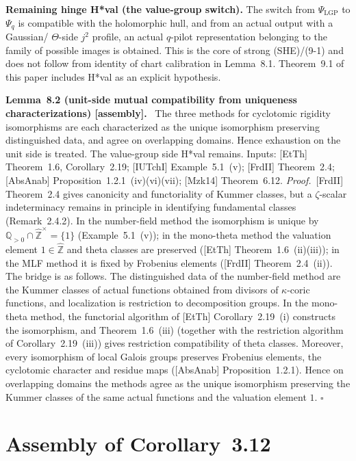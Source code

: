 \documentclass[11pt]{article}
\newcommand{\stmt}[2]{\medskip\noindent\textbf{#1\ #2.}\ }
\newcommand{\pf}{\medskip\noindent\textit{Proof.}\ }
\newcommand{\qedh}{\hfill\(\square\)\par\medskip}
\begin{document}
\medskip
\noindent\textbf{Remaining hinge H*val (the value-group switch).}
The switch from $\Psi_{\mathrm{LGP}}$ to $\Psi_q$ is compatible with
the holomorphic hull, and from an actual output with a Gaussian/
$\Theta$-side $j^2$ profile, an actual $q$-pilot representation
belonging to the family of possible images is obtained.  This is
the core of strong (SHE)/(9-1) and does not follow from identity of
chart calibration in Lemma~8.1.  Theorem~9.1 of this paper includes
H*val as an explicit hypothesis.

\stmt{Lemma}{8.2 (unit-side mutual compatibility from uniqueness characterizations) [assembly]}
The three methods for cyclotomic rigidity isomorphisms are each
characterized as the unique isomorphism preserving distinguished
data, and agree on overlapping domains.  Hence exhaustion on the
unit side is treated.  The value-group side H*val remains.
Inputs: [EtTh] Theorem~1.6, Corollary~2.19; [IUTchI]
Example~5.1~(v); [FrdII] Theorem~2.4; [AbsAnab]
Proposition~1.2.1~(iv)(vi)(vii); [Mzk14] Theorem~6.12.
\pf [FrdII] Theorem~2.4 gives canonicity and functoriality of
Kummer classes, but a $\zeta$-scalar indeterminacy remains in
principle in identifying fundamental classes (Remark~2.4.2).  In
the number-field method the isomorphism is unique by
$\mathbb Q_{>0}\cap\widehat{\mathbb Z}^{\times}=\{1\}$
(Example~5.1~(v)); in the mono-theta method the valuation element
$1\in\widehat{\mathbb Z}$ and theta classes are preserved ([EtTh]
Theorem~1.6~(ii)(iii)); in the MLF method it is fixed by Frobenius
elements ([FrdII] Theorem~2.4~(ii)).  The bridge is as follows.
The distinguished data of the number-field method are the Kummer
classes of actual functions obtained from divisors of
$\kappa$-coric functions, and localization is restriction to
decomposition groups.  In the mono-theta method, the functorial
algorithm of [EtTh] Corollary~2.19~(i) constructs the isomorphism,
and Theorem~1.6~(iii) (together with the restriction algorithm of
Corollary~2.19~(iii)) gives restriction compatibility of theta
classes.  Moreover, every isomorphism of local Galois groups
preserves Frobenius elements, the cyclotomic character and residue
maps ([AbsAnab] Proposition~1.2.1).  Hence on overlapping domains
the methods agree as the unique isomorphism preserving the Kummer
classes of the same actual functions and the valuation element $1$.
\qedh

\section{Assembly of Corollary~3.12}
\end{document}
